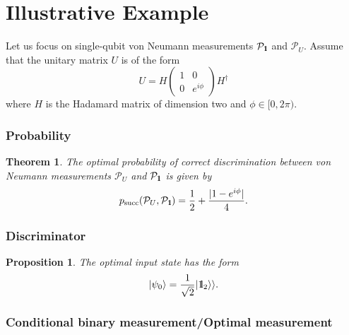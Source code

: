 \documentclass[preprint,12pt, a4paper]{elsarticle}
\newcommand{\ket}[1]{\ensuremath{|#1\rangle}}
\newcommand{\1}{{\rm 1\hspace{-0.9mm}l}}
\newcommand{\Id}{{\rm 1\hspace{-0.9mm}l}}
\newcommand{\ee}{\ensuremath{\mathrm{e}}}
\newcommand{\ii}{\ensuremath{\mathrm{i}}}
\newcommand{\PP}{\mathcal{P}}
\newcommand{\diag}{\mathrm{diag}}
\newtheorem{theorem}{Theorem}
\newtheorem{proposition}{Proposition}
\begin{document}
\section{Illustrative Example}

Let us focus on single-qubit von Neumann measurements $\PP_\1$ and $\PP_U$.
Assume that the unitary matrix $U$ is of the form
\begin{equation}
U = H
\left(\begin{array}{cc}1&0\\0&e^{i \phi}\end{array}\right)  H^\dagger
\end{equation}
where $H$ is the Hadamard matrix of dimension two and $\phi \in [0, 2 \pi)$.

\subsubsection{Probability}\label{sec:example_probability}
\begin{theorem}
The optimal probability of correct discrimination between von Neumann
measurements $\PP_U$ and $\PP_{\Id}$ is given by
\begin{equation}
p_{\text{succ}}(\PP_{U}, \PP_{\Id}) = \frac{1}{2} + \frac{|1 - e^{i \phi}  |}{4} .
\end{equation}
\end{theorem}







\subsubsection{Discriminator}\label{sec:example_discriminator}

\begin{proposition}\label{prop-discrim}
 The optimal input state has the form
\begin{equation}
\ket{\psi_{0}} = \frac{1}{\sqrt{2}} |\Id_2 \rangle \rangle.
\end{equation}
\end{proposition}



%

\subsubsection{Conditional binary measurement/Optimal measurement}\label{sec_example_final_measurement}
\end{document}
